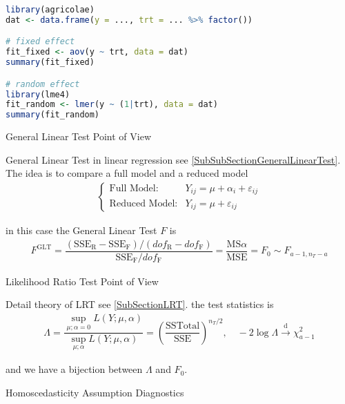 \begin{rcode}
\begin{lstlisting}[language=R]
library(agricolae)
dat <- data.frame(y = ..., trt = ... %>% factor()) 

# fixed effect
fit_fixed <- aov(y ~ trt, data = dat)
summary(fit_fixed)

# random effect 
library(lme4)
fit_random <- lmer(y ~ (1|trt), data = dat)
summary(fit_random)
\end{lstlisting}
\end{rcode}


\begin{point}
    General Linear Test Point of View
\end{point}

General Linear Test in linear regression see \autoref{SubSubSectionGeneralLinearTest}. The idea is to compare a full model and a reduced model
\begin{align}
    \begin{cases}
        \text{Full Model}:&Y_{ij}=\mu +\alpha _i+\varepsilon _{ij}\\
        \text{Reduced Model}:&Y_{ij}=\mu +\varepsilon _{ij}
    \end{cases} 
\end{align}

in this case the General Linear Test $ F $ is 
\begin{align}
    F^\mathrm{ GLT }=\dfrac{(\mathrm{SSE_R-SSE_F})/(dof_\mathrm{R}-dof_\mathrm{F} )}{\mathrm{SSE_F}/dof_\mathrm{ F } } =\dfrac{ \mathrm{ MS }\alpha   }{ \mathrm{ MSE }  }=F_0\sim F_{a-1,n_T-a}   
\end{align}

\begin{point}
    Likelihood Ratio Test Point of View
\end{point}

Detail theory of LRT see \autoref{SubSectionLRT}. the test statistics is
\begin{align}
    \Lambda = \dfrac{{\displaystyle \sup_{\mu;\alpha =0}L(Y;\mu ,\alpha ) }}{{\displaystyle \sup_{\mu;\alpha}L(Y;\mu ,\alpha ) }}=\left(\dfrac{\mathrm{ SSTotal }  }{\mathrm{ SSE }  } \right)^{n_T/2},\quad -2\log \Lambda \xrightarrow[]{\mathrm{d}} \chi^2_{a-1}
\end{align}

and we have a bijection between $ \Lambda  $ and $ F_0 $.


\begin{point}
    Homoscedasticity Assumption Diagnostics 
\end{point}

